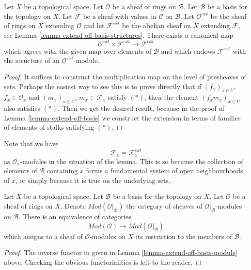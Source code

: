 \begin{lemma}
\label{lemma-extend-off-basis-module}
Let $X$ be a topological space. Let $\mathcal{O}$
be a sheaf of rings on $\mathcal{B}$.
Let $\mathcal{B}$ be a basis for the topology on $X$.
Let $\mathcal{F}$ be a sheaf with values in $\mathcal{C}$
on $\mathcal{B}$. Let $\mathcal{O}^{ext}$ be the sheaf
of rings on $X$ extending $\mathcal{O}$ and let
$\mathcal{F}^{ext}$ be the abelian sheaf on $X$ extending 
$\mathcal{F}$, see Lemma \ref{lemma-extend-off-basis-structures}.
There exists a canonical map
$$
\mathcal{O}^{ext} \times \mathcal{F}^{ext}
\longrightarrow
\mathcal{F}^{ext}
$$
which agrees with the given map over elements of $\mathcal{B}$
and which endows $\mathcal{F}^{ext}$ with the structure
of an $\mathcal{O}^{ext}$-module.
\end{lemma}

\begin{proof}
It suffices to construct the multiplication map
on the level of presheaves of sets. Perhaps the easiest
way to see this is to prove directly that if
$(f_x)_{x \in U}$, $f_x \in \mathcal{O}_x$
and
$(m_x)_{x \in U}$, $m_x \in \mathcal{F}_x$
satisfy $(*)$, then the element 
$(f_xm_x)_{x \in U}$ also satisfies $(*)$.
Then we get the desired result, because in the proof
of Lemma \ref{lemma-extend-off-basis} we construct the extension 
in terms of families of elements of stalks satisfying $(*)$.
\end{proof}

\noindent
Note that we have
$$
\mathcal{F}_x = \mathcal{F}_x^{ext}
$$
as $\mathcal{O}_x$-modules in the situation of the lemma.
This is so because the collection of elements of $\mathcal{B}$ containing
$x$ forms a fundamental system of open neighbourhoods of $x$, or
simply because it is true on the underlying sets.

\begin{lemma}
\label{lemma-restrict-basis-equivalence-modules}
Let $X$ be a topological space.
Let $\mathcal{B}$ be a basis for the topology on $X$.
Let $\mathcal{O}$ be a sheaf of rings on $X$.
Denote $\textit{Mod}(\mathcal{O}|_\mathcal{B})$ the category of
sheaves of $\mathcal{O}|_{\mathcal{B}}$-modules on $\mathcal{B}$.
There is an equivalence of categories
$$
\textit{Mod}(\mathcal{O})
\longrightarrow
\textit{Mod}(\mathcal{O}|_\mathcal{B})
$$
which assigns to a sheaf of $\mathcal{O}$-modules on $X$ its restriction to
the members of $\mathcal{B}$.
\end{lemma}

\begin{proof}
The inverse functor in given in
Lemma \ref{lemma-extend-off-basis-module} above.
Checking the obvious functorialities is left to the reader.
\end{proof}

